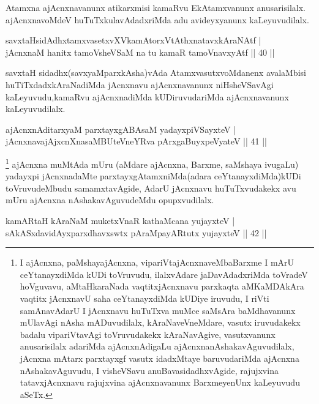 \begin{artha}
Atamxna ajAcnxnavanunx atikarxmisi kamaRvu EkAtamxvanunx anusarisilalx. ajAcnxnavoMdeV huTuTxkulavAdadxriMda adu avideyxyanunx kaLeyuvudilalx.
\end{artha}

\begin{shl}
savxtaHsidAdhxtamxvasetxvXVkamAtorxVtAthxnatavxkAraNAtf |\\
jAcnxnaM hanitx tamoV\s sheVSaM na tu kamaR tamoVnavxyAtf \hfill || 40 ||
\end{shl}

\begin{artha}
savxtaH sidadhx(savxyaMparxkAsha)vAda AtamxvasutxvoMdanenx avalaMbisi huTiTxdadxkAraNadiMda jAcnxnavu ajAcnxnavanunx niHsheVSavAgi kaLeyuvudu,kamaRvu ajAcnxnadiMda kUDiruvudariMda ajAcnxnavanunx kaLeyuvudilalx.
\end{artha}

\begin{shl}
ajAcnxnAditarxyaM parxtayxgABAsaM yadayxpiVSayxteV |\\
jAcnxnavajAjxcnXnasaMBUteVneYRva pArxgaBuyxpeVyateV \hfill || 41 ||
\end{shl}

\begin{artha}
\footnote{I ajAcnxna, paMshayajAcnxna, vipariVtajAcnxnaveMbaBarxme I mArU ceYtanayxdiMda kUDi toVruvudu, ilalxvAdare jaDavAdadxriMda toVradeV hoVguvavu, aMtaHkaraNada vaqtitxjAcnxnavu parxkaqta aMKaMDAkAra vaqtitx jAcnxnavU saha ceYtanayxdiMda kUDiye iruvudu, I riVti samAnavAdarU I jAcnxnavu huTuTxva muMce saMsAra baMdhavanunx mUlavAgi nAsha mADuvudilalx, kAraNaveVneMdare, vasutx iruvudakekx badalu vipariVtavAgi toVruvudakekx kAraNavAgive, vasutxvanunx anusarisilalx adariMda ajAcnxnAdigaLu ajAcnxnanAshakavAguvudilalx, jAcnxna  mAtarx parxtayxgf vasutx idadxMtaye baruvudariMda ajAcnxna nAshakavAguvudu, I visheVSavu anuBavasidadhxvAgide, rajujxvina tatavxjAcnxnavu rajujxvina ajAcnxnavanunx BarxmeyenUnx kaLeyuvudu aSeTx.} ajAcnxna muMtAda mUru (aMdare ajAcnxna, Barxme, saMshaya ivugaLu) yadayxpi jAcnxnadaMte parxtayxgAtamxniMda(adara ceYtanayxdiMda)kUDi toVruvudeMbudu samamxtavAgide, AdarU jAcnxnavu huTuTxvudakekx avu mUru ajAcnxna nAshakavAguvudeMdu opupxvudilalx.
\end{artha}

\begin{shl}
kamARtaH kAraNaM muketxVnaR kathaMcana yujayxteV |\\
sAkASxdavidAyxparxdhavxswtx pAraMpayARtutx yujayxteV \hfill || 42 ||
\end{shl}


